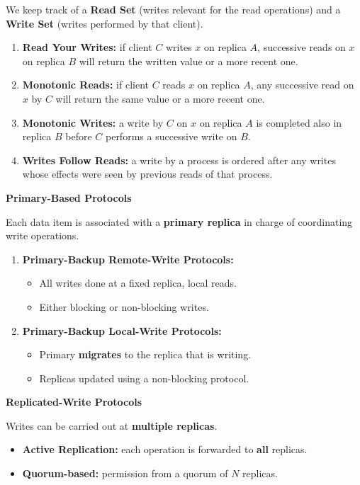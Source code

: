 \documentclass[a4paper, 10pt, twocolumn]{article}
\begin{document}
    We keep track of a \textbf{Read Set} (writes relevant for the read operations) and a \textbf{Write Set} (writes performed by that client).
    \begin{enumerate}
        \item \textbf{Read Your Writes:} if client $C$ writes $x$ on replica $A$, successive reads on $x$ on replica $B$ will return the written value or a more recent one.
        \item \textbf{Monotonic Reads:} if client $C$ reads $x$ on replica $A$, any successive read on $x$ by $C$ will return the same value or a more recent one.
        \item \textbf{Monotonic Writes:} a write by $C$ on $x$ on replica $A$ is completed also in replica $B$ before $C$ performs a successive write on $B$.
        \item \textbf{Writes Follow Reads:} a write by a process is ordered after any writes whose effects were seen by previous reads of that process.
    \end{enumerate}

    \textbf{Primary-Based Protocols}

    Each data item is associated with a \textbf{primary replica} in charge of coordinating write operations.
    \begin{enumerate}
        \item \textbf{Primary-Backup Remote-Write Protocols:}
        \begin{itemize}
            \item All writes done at a fixed replica, local reads.
            \item Either blocking or non-blocking writes.
        \end{itemize}
        \item \textbf{Primary-Backup Local-Write Protocols:}
        \begin{itemize}
            \item Primary \textbf{migrates} to the replica that is writing.
            \item Replicas updated using a non-blocking protocol.
        \end{itemize}
    \end{enumerate}

    \textbf{Replicated-Write Protocols}

    Writes can be carried out at \textbf{multiple replicas}.
    \begin{itemize}
        \item \textbf{Active Replication:} each operation is forwarded to \textbf{all} replicas.
        \item \textbf{Quorum-based:} permission from a quorum of $N$ replicas.
    \end{itemize}
\end{document}
